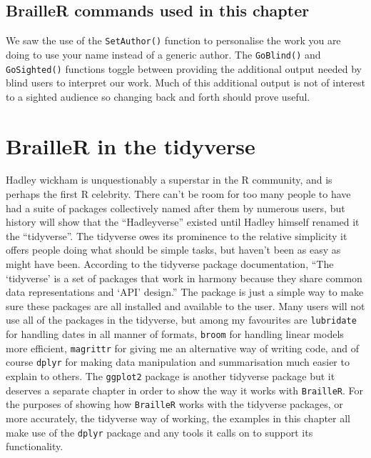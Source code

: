 \documentclass[
]{book}
\begin{document}
\hypertarget{brailler-commands-used-in-this-chapter-4}{%
\section{BrailleR commands used in this chapter}\label{brailler-commands-used-in-this-chapter-4}}

We saw the use of the \texttt{SetAuthor()} function to personalise the work you are doing to use your name instead of a generic author. The \texttt{GoBlind()} and \texttt{GoSighted()} functions toggle between providing the additional output needed by blind users to interpret our work. Much of this additional output is not of interest to a sighted audience so changing back and forth should prove useful.

\hypertarget{Tidyverse}{%
\chapter{BrailleR in the tidyverse}\label{Tidyverse}}

Hadley wickham is unquestionably a superstar in the R community, and is perhaps the first R celebrity. There can't be room for too many people to have had a suite of packages collectively named after them by numerous users, but history will show that the ``Hadleyverse'' existed until Hadley himself renamed it the ``tidyverse''. The tidyverse owes its prominence to the relative simplicity it offers people doing what should be simple tasks, but haven't been as easy as might have been. According to the tidyverse package \citep{Rpkg-tidyverse} documentation, ``The `tidyverse' is a set of packages that work in harmony
because they share common data representations and `API' design.'' The package is just a simple way to make sure these packages are all installed and available to the user. Many users will not use all of the packages in the tidyverse, but among my favourites are \texttt{lubridate} \citep{Rpkg-lubridate} for handling dates in all manner of formats, \texttt{broom} \citep{Rpkg-broom} for handling linear models more efficient,
\texttt{magrittr} \citep{Rpkg-magrittr} for giving me an alternative way of writing code, and of course \texttt{dplyr} \citep{Rpkg-dplyr} for making data manipulation and summarisation much easier to explain to others. The \texttt{ggplot2} package \citep{Rpkg-ggplot2} is another tidyverse package but it deserves a separate chapter in order to show the way it works with \texttt{BrailleR}. For the purposes of showing how \texttt{BrailleR} works with the tidyverse packages, or more accurately, the tidyverse way of working, the examples in this chapter all make use of the \texttt{dplyr} package and any tools it calls on to support its functionality.
\end{document}
